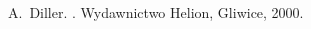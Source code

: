 \documentclass[pdflatex,11pt]{others/aghdpl}
\author{Jakub Syrek}
\date{2016}
\begin{document}









% 
% 



\begin{thebibliography}{1}

A.~Diller.
.
\newblock Wydawnictwo Helion, Gliwice, 2000.



\end{thebibliography}
\end{document}
